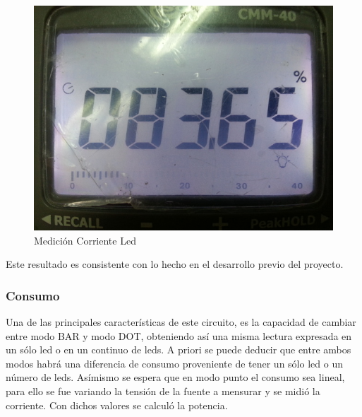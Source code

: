 \documentclass[12pt,a4paper]{article}
\begin{document}
			\begin{figure}[H]
			\centering
				\includegraphics[scale=0.5]{images/sonel.jpg}\caption{Medición Corriente Led}
			\end{figure}

			Este resultado es consistente con lo hecho en el desarrollo previo del proyecto.

			\subsubsection{Consumo}
				Una de las principales características de este circuito, es la capacidad de cambiar entre modo BAR y modo DOT, obteniendo así una misma lectura expresada en un sólo led o en un continuo de leds. A priori se puede deducir que entre ambos modos habrá una diferencia de consumo proveniente de tener un sólo led o un número de leds. Asímismo se espera que en modo punto el consumo sea lineal, para ello se fue variando la tensión de la fuente a mensurar y se midió la corriente. Con dichos valores se calculó la potencia.
\end{document}
